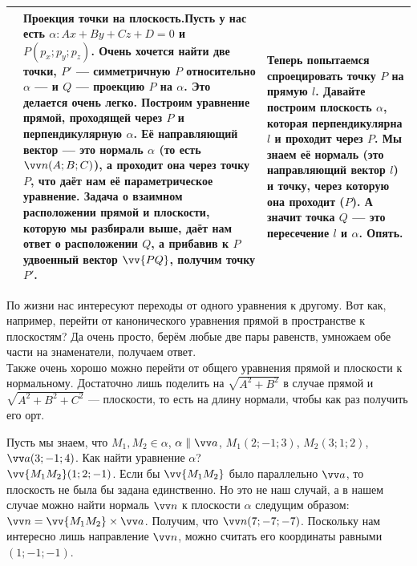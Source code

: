 \documentclass{article}
\let\vec\vv
\begin{document}
\begin{itemize}
\begin{Comment}
\begin{tabular}{|m{}|m{}|m{}|}
                & Проекция точки на плоскость.\newline Пусть у нас есть $\alpha\colon Ax+By+Cz+D=0$ и $P(p_x;p_y;p_z)$. Очень хочется найти две точки, $P'$ --- симметричную $P$ относительно $\alpha$ --- и $Q$ --- проекцию $P$ на $\alpha$. Это делается очень легко. Построим уравнение прямой, проходящей через $P$ и перпендикулярную $\alpha$. Её направляющий вектор --- это нормаль $\alpha$ (то есть $\vec n(A;B;C)$), а проходит она через точку $P$, что даёт нам её параметрическое уравнение. Задача о взаимном расположении прямой и плоскости, которую мы разбирали выше, даёт нам ответ о расположении $Q$, а прибавив к $P$ удвоенный вектор $\vec{PQ}$, получим точку $P'$.& Теперь попытаемся спроецировать точку $P$ на прямую $l$. Давайте построим плоскость $\alpha$, которая перпендикулярна $l$ и проходит через $P$. Мы знаем её нормаль (это направляющий вектор $l$) и точку, через которую она проходит ($P$). А значит точка $Q$ --- это пересечение $l$ и $\alpha$. Опять.\\
                \hline
            \end{tabular}
        \end{Comment}
        \begin{Comment}
            По жизни нас интересуют переходы от одного уравнения к другому. Вот как, например, перейти от канонического уравнения прямой в пространстве к плоскостям? Да очень просто, берём любые две пары равенств, умножаем обе части на знаменатели, получаем ответ.\\
            Также очень хорошо можно перейти от общего уравнения прямой и плоскости к нормальному. Достаточно лишь поделить на $\sqrt{A^2+B^2}$ в случае прямой и $\sqrt{A^2+B^2+C^2}$ --- плоскости, то есть на длину нормали, чтобы как раз получить его орт.
        \end{Comment}
        \begin{Example}
            Пусть мы знаем, что $M_1,M_2\in\alpha$, $\alpha\parallel\vec a$, $M_1(2;-1;3)$, $M_2(3;1;2)$, $\vec a(3;-1;4)$. Как найти уравнение $\alpha$?\\
            $\vec{M_1M_2}(1;2;-1)$. Если бы $\vec{M_1M_2}$ было параллельно $\vec a$, то плоскость не была бы задана единственно. Но это не наш случай, а в нашем случае можно найти нормаль $\vec n$ к плоскости $\alpha$ следущим образом: $\vec n=\vec{M_1M_2}\times\vec a$. Получим, что $\vec n(7;-7;-7)$. Поскольку нам интересно лишь направление $\vec n$, можно считать его координаты равными $(1;-1;-1)$.\\

\end{Example}
\end{itemize}
\end{document}

